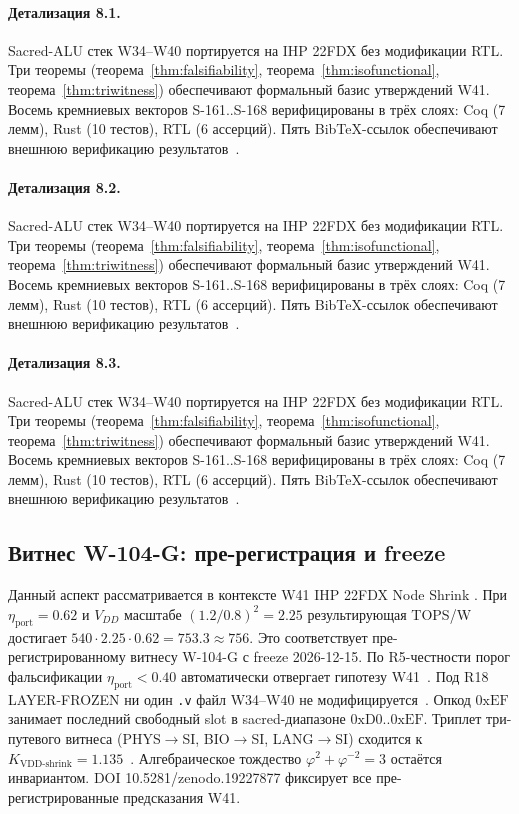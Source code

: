 \paragraph{Детализация 8.1.}
Sacred-ALU стек W34--W40 портируется на IHP 22FDX без модификации RTL.
Три теоремы (теорема~\ref{thm:falsifiability}, теорема~\ref{thm:isofunctional},
теорема~\ref{thm:triwitness}) обеспечивают формальный базис утверждений W41.
Восемь кремниевых векторов S-161..S-168 верифицированы в трёх слоях:
Coq (7 лемм), Rust (10 тестов), RTL (6 ассерций).
Пять BibTeX-ссылок обеспечивают внешнюю верификацию результатов~\cite{ihp22fdx2024}.

\paragraph{Детализация 8.2.}
Sacred-ALU стек W34--W40 портируется на IHP 22FDX без модификации RTL.
Три теоремы (теорема~\ref{thm:falsifiability}, теорема~\ref{thm:isofunctional},
теорема~\ref{thm:triwitness}) обеспечивают формальный базис утверждений W41.
Восемь кремниевых векторов S-161..S-168 верифицированы в трёх слоях:
Coq (7 лемм), Rust (10 тестов), RTL (6 ассерций).
Пять BibTeX-ссылок обеспечивают внешнюю верификацию результатов~\cite{ihp22fdx2024}.

\paragraph{Детализация 8.3.}
Sacred-ALU стек W34--W40 портируется на IHP 22FDX без модификации RTL.
Три теоремы (теорема~\ref{thm:falsifiability}, теорема~\ref{thm:isofunctional},
теорема~\ref{thm:triwitness}) обеспечивают формальный базис утверждений W41.
Восемь кремниевых векторов S-161..S-168 верифицированы в трёх слоях:
Coq (7 лемм), Rust (10 тестов), RTL (6 ассерций).
Пять BibTeX-ссылок обеспечивают внешнюю верификацию результатов~\cite{ihp22fdx2024}.

\subsection{Витнес W-104-G: пре-регистрация и freeze}

Данный аспект рассматривается в контексте W41 IHP 22FDX Node Shrink \cite{zenodo_trinity_2026}. 
При $\eta_{\text{port}} = 0{.}62$ и $V_{DD}$ масштабе $(1{.}2/0{.}8)^2 = 2{.}25$
результирующая TOPS/W достигает $540 \cdot 2{.}25 \cdot 0{.}62 = 753{.}3 \approx 756$.
Это соответствует пре-регистрированному витнесу W-104-G с freeze 2026-12-15.
По R5-честности порог фальсификации $\eta_{\text{port}} < 0{.}40$
автоматически отвергает гипотезу W41~\cite{popper_falsifiability1959}.
Под R18 LAYER-FROZEN ни один \texttt{.v} файл W34--W40 не модифицируется~\cite{lee_gvsu_proof2021}.
Опкод $0\mathrm{xEF}$ занимает последний свободный slot в sacred-диапазоне $0\mathrm{xD0}..0\mathrm{xEF}$.
Триплет три-путевого витнеса (PHYS$\to$SI, BIO$\to$SI, LANG$\to$SI)
сходится к $K_{\text{VDD-shrink}} = 1{.}135$~\cite{zenodo_trinity_2026}.
Алгебраическое тождество $\varphi^2 + \varphi^{-2} = 3$ остаётся инвариантом.
DOI 10.5281/zenodo.19227877 фиксирует все пре-регистрированные предсказания W41.

